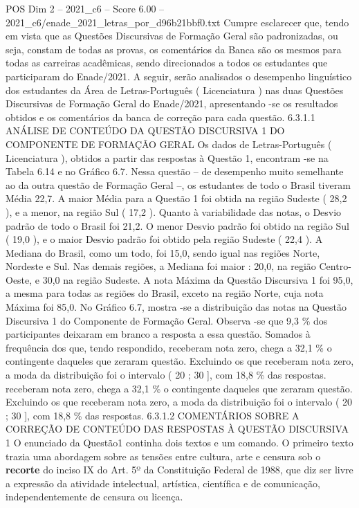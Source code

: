 \begin{textsample}{POS Dim 2 – 2021\_c6 – Score 6.00 – 2021\_c6/enade\_2021\_letras\_por\_d96b21bbf0.txt}
Cumpre esclarecer que, tendo em vista que as Questões Discursivas de Formação Geral são padronizadas, ou seja, constam de todas as provas, os comentários da Banca são os mesmos para todas as carreiras acadêmicas, sendo direcionados a todos os estudantes que participaram do Enade/2021.
A seguir, serão analisados o desempenho linguístico dos estudantes da Área de Letras-Português ( Licenciatura ) nas duas Questões Discursivas de Formação Geral do Enade/2021, apresentando -se os resultados obtidos e os comentários da banca de correção para cada questão. 6.3.1.1 ANÁLISE DE CONTEÚDO DA QUESTÃO DISCURSIVA 1 DO COMPONENTE DE FORMAÇÃO GERAL Os dados de Letras-Português ( Licenciatura ), obtidos a partir das respostas à Questão 1, encontram -se na Tabela 6.14 e no Gráfico 6.7.
Nessa questão – de desempenho muito semelhante ao da outra questão de Formação Geral –, os estudantes de todo o Brasil tiveram Média 22,7.
A maior Média para a Questão 1 foi obtida na região Sudeste ( 28,2 ), e a menor, na região Sul ( 17,2 ).
Quanto à variabilidade das notas, o Desvio padrão de todo o Brasil foi 21,2.
O menor Desvio padrão foi obtido na região Sul ( 19,0 ), e o maior Desvio padrão foi obtido pela região Sudeste ( 22,4 ).
A Mediana do Brasil, como um todo, foi 15,0, sendo igual nas regiões Norte, Nordeste e Sul.
Nas demais regiões, a Mediana foi maior : 20,0, na região Centro-Oeste, e 30,0 na região Sudeste.
A nota Máxima da Questão Discursiva 1 foi 95,0, a mesma para todas as regiões do Brasil, exceto na região Norte, cuja nota Máxima foi 85,0.
No Gráfico 6.7, mostra -se a distribuição das notas na Questão Discursiva 1 do Componente de Formação Geral.
Observa -se que 9,3 \% dos participantes deixaram em branco a resposta a essa questão.
Somados à frequência dos que, tendo respondido, receberam nota zero, chega a 32,1 \% o contingente daqueles que zeraram questão.
Excluindo os que receberam nota zero, a moda da distribuição foi o intervalo ( 20 ; 30 ], com 18,8 \% das respostas. receberam nota zero, chega a 32,1 \% o contingente daqueles que zeraram questão.
Excluindo os que receberam nota zero, a moda da distribuição foi o intervalo ( 20 ; 30 ], com 18,8 \% das respostas. 6.3.1.2 COMENTÁRIOS SOBRE A CORREÇÃO DE CONTEÚDO DAS RESPOSTAS À QUESTÃO DISCURSIVA 1 O enunciado da Questão1 continha dois textos e um comando.
O primeiro texto trazia uma abordagem sobre as tensões entre cultura, arte e censura sob o \textbf{recorte} do inciso IX do Art. 5º da Constituição Federal de 1988, que diz ser livre a expressão da atividade intelectual, artística, científica e de comunicação, independentemente de censura ou licença.

\end{textsample}
